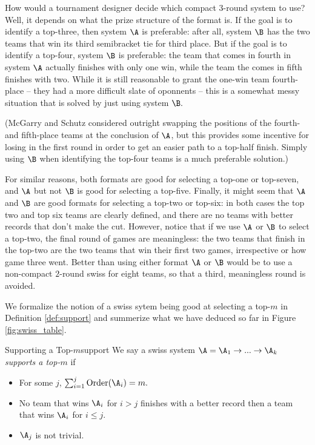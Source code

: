 {    
    
    How would a tournament designer decide which compact 3-round system to use? Well, it depends on what the prize structure of the format is. If the goal is to identify a top-three, then system $\A$ is preferable: after all, system $\B$ has the two teams that win its third semibracket tie for third place. But if the goal is to identify a top-four, system $\B$ is preferable: the team that comes in fourth in system $\A$ actually finishes with only one win, while the team the comes in fifth finishes with two. While it is still reasonable to grant the one-win team fourth-place -- they had a more difficult slate of oponnents -- this is a somewhat messy situation that is solved by just using system $\B.$
    
    (McGarry and Schutz \cite{four_five_swap} considered outright swapping the positions of the fourth- and fifth-place teams at the conclusion of $\A$, but this provides some incentive for losing in the first round in order to get an easier path to a top-half finish. Simply using $\B$ when identifying the top-four teams is a much preferable solution.)

    For similar reasons, both formats are good for selecting a top-one or top-seven, and $\A$ but not $\B$ is good for selecting a top-five. Finally, it might seem that $\A$ and $\B$ are good formats for selecting a top-two or top-six: in both cases the top two and top six teams are clearly defined, and there are no teams with better records that don't make the cut. However, notice that if we use $\A$ or $\B$ to select a top-two, the final round of games are meaningless: the two teams that finish in the top-two are the two teams that win their first two games, irrespective or how game three went. Better than using either format $\A$ or $\B$ would be to use a non-compact $2$-round swiss for eight teams, so that a third, meaningless round is avoided.
    
    We formalize the notion of a swiss sytem being good at selecting a top-$m$ in Definition \ref{def:support} and summerize what we have deduced so far in Figure \ref{fig:swiss_table}.

    \begin{definition}{Supporting a Top-$m$}{support}
        We say a swiss system $\A = \A_1 \to ... \to \A_k$ \textit{supports a top-$m$} if
        \begin{itemize}
            \item For some $j$, $\sum_{i=1}^j \textrm{Order}(\A_i) = m.$
            \item No team that wins $\A_i$ for $i > j$ finishes with a better record then a team that wins $\A_i$ for $i \leq j.$
            \item $\A_j$ is not trivial.
        \end{itemize}
    \end{definition}

}
